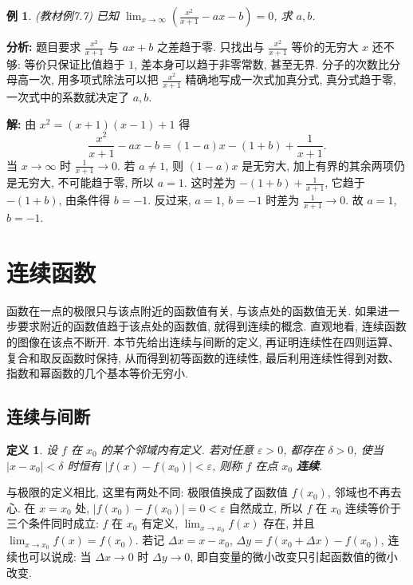 \documentclass[UTF8,openany]{ctexbook}
\theoremstyle{chinesetextbook}
\newtheorem{definition}{定义}[section]
\newtheorem{example}{例}[section]
\newenvironment{cnsolution}{\par\indent\textbf{解:} \ignorespaces}{\par}
\begin{document}
\begin{example}
\textnormal{(教材例7.7)} 已知 $\displaystyle\lim_{x\to\infty}\left(\frac{x^2}{x+1}-ax-b\right)=0$, 求 $a,b$.
\end{example}
\par\indent\textbf{分析:} 题目要求 $\displaystyle\frac{x^2}{x+1}$ 与 $ax+b$ 之差趋于零. 只找出与 $\displaystyle\frac{x^2}{x+1}$ 等价的无穷大 $x$ 还不够: 等价只保证比值趋于 $1$, 差本身可以趋于非零常数, 甚至无界. 分子的次数比分母高一次, 用多项式除法可以把 $\displaystyle\frac{x^2}{x+1}$ 精确地写成一次式加真分式, 真分式趋于零, 一次式中的系数就决定了 $a,b$.
\begin{cnsolution}
由 $x^2=(x+1)(x-1)+1$ 得
\[
\frac{x^2}{x+1}-ax-b=(1-a)x-(1+b)+\frac1{x+1}.
\]
当 $x\to\infty$ 时 $\displaystyle\frac1{x+1}\to0$. 若 $a\ne1$, 则 $(1-a)x$ 是无穷大, 加上有界的其余两项仍是无穷大, 不可能趋于零, 所以 $a=1$. 这时差为 $\displaystyle-(1+b)+\frac1{x+1}$, 它趋于 $-(1+b)$, 由条件得 $b=-1$. 反过来, $a=1$, $b=-1$ 时差为 $\displaystyle\frac1{x+1}\to0$. 故 $a=1$, $b=-1$.
\end{cnsolution}
\section{连续函数}
函数在一点的极限只与该点附近的函数值有关, 与该点处的函数值无关. 如果进一步要求附近的函数值趋于该点处的函数值, 就得到连续的概念. 直观地看, 连续函数的图像在该点不断开. 本节先给出连续与间断的定义, 再证明连续性在四则运算、复合和取反函数时保持, 从而得到初等函数的连续性, 最后利用连续性得到对数、指数和幂函数的几个基本等价无穷小.
\subsection{连续与间断}
\begin{definition}
设 $f$ 在 $x_0$ 的某个邻域内有定义. 若对任意 $\varepsilon>0$, 都存在 $\delta>0$, 使当 $|x-x_0|<\delta$ 时恒有 $|f(x)-f(x_0)|<\varepsilon$, 则称 $f$ 在点 $x_0$ \textbf{连续}.
\end{definition}
与极限的定义相比, 这里有两处不同: 极限值换成了函数值 $f(x_0)$, 邻域也不再去心. 在 $x=x_0$ 处, $|f(x_0)-f(x_0)|=0<\varepsilon$ 自然成立, 所以 $f$ 在 $x_0$ 连续等价于三个条件同时成立: $f$ 在 $x_0$ 有定义, $\displaystyle\lim_{x\to x_0}f(x)$ 存在, 并且 $\displaystyle\lim_{x\to x_0}f(x)=f(x_0)$. 若记 $\Delta x=x-x_0$, $\Delta y=f(x_0+\Delta x)-f(x_0)$, 连续也可以说成: 当 $\Delta x\to0$ 时 $\Delta y\to0$, 即自变量的微小改变只引起函数值的微小改变.
\end{document}
